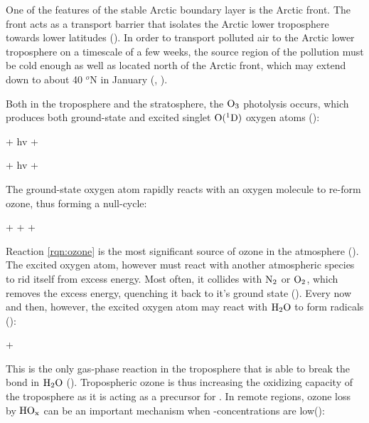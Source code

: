 \medskip

One of the features of the stable Arctic boundary layer is the Arctic front. The front acts as a transport barrier that isolates the Arctic lower troposphere towards lower latitudes (\cite{BARRIE1986643}). In order to transport polluted air to the Arctic lower troposphere on a timescale of a few weeks, the source region of the pollution must be cold enough as well as located north of the Arctic front, which may extend down to about 40 $^o$N in January (\cite{BARRIE1986643}, \cite{AMAP2015}). 


\medskip

Both in the troposphere and the stratosphere, the $\mathrm{O_3}$ photolysis occurs, which produces both ground-state  and excited singlet $\mathrm{O(^1D)}$ oxygen atoms (\cite{SeinfeldSpyros}): 

\begin{reaction}
     + hv \rightarrow {} + 
    \label{rqn:groundstate_O2}
\end{reaction}

\begin{reaction}
     + hv \rightarrow {} + 
    \label{rqn:excited_O2}
\end{reaction}

The ground-state oxygen atom rapidly reacts with an oxygen molecule to re-form ozone, thus forming a null-cycle:

\begin{reaction}
     +  +  \rightarrow {} + 
    \label{rqn:ozone}
\end{reaction}

Reaction \ref{rqn:ozone} is the most significant source of ozone in the atmosphere (\cite{SeinfeldSpyros}). The excited oxygen atom, however must react with another atmospheric species to rid itself from excess energy. Most often, it collides with $\mathrm{N_2}$ or $\mathrm{O_2}$, which removes the excess energy, quenching it back to it's ground state (\cite{Levy1971}). Every now and then, however, the excited oxygen atom may react with $\mathrm{H_2O}$ to form  radicals (\cite{SeinfeldSpyros}): 

\begin{reaction}
     +  
    \label{rqn:OH}
\end{reaction}

This is the only gas-phase reaction in the troposphere that is able to break the  bond in $\mathrm{H_2O}$ (\cite{SeinfeldSpyros}). Tropospheric ozone is thus increasing the oxidizing capacity of the troposphere as it is acting as a precursor for . In remote regions, ozone loss by $\mathrm{HO_x}$ can be an important mechanism when -concentrations are low(\cite{Jacob1999}): 


